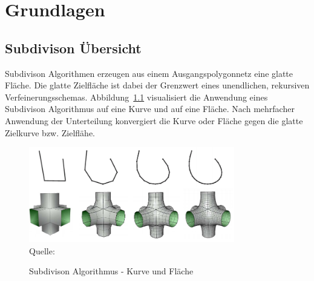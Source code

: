 \chapter{Grundlagen}


\section{Subdivison Übersicht}

Subdivison Algorithmen erzeugen aus einem Ausgangspolygonnetz eine glatte Fläche.
Die glatte Zielfläche ist dabei der Grenzwert eines unendlichen, rekursiven Verfeinerungsschemas.
Abbildung~\ref{fig:sd} visualisiert die Anwendung eines Subdivison Algorithmus auf eine Kurve und auf eine Fläche.
Nach mehrfacher Anwendung der Unterteilung konvergiert die Kurve oder Fläche gegen die glatte Zielkurve bzw. Zielflähe.
\begin{figure}[h]
  \caption{Subdivison Algorithmus - Kurve und Fläche}
  \centering
  \includegraphics[width=0.8\textwidth]{content/media/sd.png}
  \\Quelle: \cite{Standford.24.07.2015}
  \label{fig:sd}
\end{figure}

